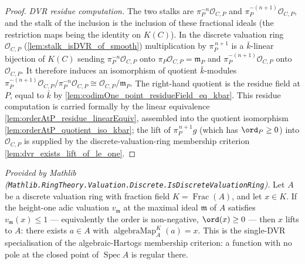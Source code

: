 \begin{proof}
  \emph{DVR residue computation.} The two stalks are
  \(\pi_P^{-n}\mathcal O_{C,P}\) and \(\pi_P^{-(n+1)}\mathcal O_{C,P}\), and the
  stalk of the inclusion is the inclusion of these fractional ideals (the
  restriction maps being the identity on \(K(C)\)). In the discrete valuation
  ring \(\mathcal O_{C,P}\) (\cref{lem:stalk_isDVR_of_smooth}) multiplication by
  \(\pi_P^{\,n+1}\) is a \(\bar k\)-linear bijection of \(K(C)\) sending
  \(\pi_P^{-n}\mathcal O_{C,P}\) onto \(\pi_P\mathcal O_{C,P} = \mathfrak m_P\)
  and \(\pi_P^{-(n+1)}\mathcal O_{C,P}\) onto \(\mathcal O_{C,P}\). It therefore
  induces an isomorphism of quotient \(\bar k\)-modules
  \(\pi_P^{-(n+1)}\mathcal O_{C,P}/\pi_P^{-n}\mathcal O_{C,P} \cong \mathcal
  O_{C,P}/\mathfrak m_P\). The right-hand quotient is the residue field at \(P\),
  equal to \(\bar k\) by \cref{lem:codimOne_point_residueField_eq_kbar}. This
  residue computation is carried formally by the linear equivalence
  \cref{lem:orderAtP_residue_linearEquiv}, assembled into the quotient
  isomorphism \cref{lem:orderAtP_quotient_iso_kbar}; the lift of
  \(\pi_P^{\,n+1} g\) (which has \(\ord_P \ge 0\)) into \(\mathcal O_{C,P}\) is
  supplied by the discrete-valuation-ring membership criterion
  \cref{lem:dvr_exists_lift_of_le_one}.
\end{proof}

\begin{lemma}
  \label{lem:dvr_exists_lift_of_le_one}
  \mathlibok
  \textit{Provided by Mathlib
  (\texttt{Mathlib.RingTheory.Valuation.Discrete.IsDiscreteValuationRing}).}
  Let \(A\) be a discrete valuation ring with fraction field
  \(K = \operatorname{Frac}(A)\), and let \(x \in K\). If the height-one adic
  valuation \(v_{\mathfrak m}\) at the maximal ideal \(\mathfrak m\) of \(A\)
  satisfies \(v_{\mathfrak m}(x) \le 1\) --- equivalently the order is
  non-negative, \(\ord(x) \ge 0\) --- then \(x\) lifts to \(A\): there exists
  \(a \in A\) with \(\operatorname{algebraMap}_A^K(a) = x\). This is the
  single-DVR specialisation of the algebraic-Hartogs membership criterion: a
  function with no pole at the closed point of \(\operatorname{Spec} A\) is
  regular there.
\end{lemma}

